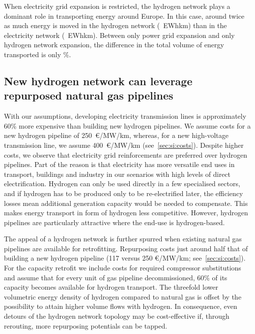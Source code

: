 When electricity grid expansion is restricted, the hydrogen network plays a
dominant role in transporting energy around Europe. In this case, around twice
as much energy is moved in the hydrogen network (\ewhkmhydrogen~EWhkm) than in
the electricity network (\ewhkmelectricity~EWhkm). Between only power grid
expansion and only hydrogen network expansion, the difference in the total
volume of energy transported is only \ewhkmdiff\%.

\subsection*{New hydrogen network can leverage repurposed natural gas pipelines}
\label{sec:repurposed}

With our assumptions, developing electricity transmission lines is approximately
60\% more expensive than building new hydrogen pipelines. We assume costs for a
new hydrogen pipeline of 250~\euro/MW/km, whereas, for a new high-voltage
transmission line, we assume 400~\euro/MW/km (see~\cref{sec:si:costs}). Despite
higher costs, we observe that electricity grid reinforcements are preferred over
hydrogen pipelines. Part of the reason is that electricity has more versatile
end uses in transport, buildings and industry in our scenarios with high levels
of direct electrification. Hydrogen can only be used directly in a few
specialised sectors, and if hydrogen has to be produced only to be
re-electrified later, the efficiency losses mean additional generation capacity
would be needed to compensate. This makes energy transport in form of hydrogen
less competitive. However, hydrogen pipelines are particularly attractive where
the end-use is hydrogen-based.

The appeal of a hydrogen network is further spurred when existing natural gas
pipelines are available for retrofitting. Repurposing costs just around half
that of building a new hydrogen pipeline (117 versus 250 \euro/MW/km;
see~\cref{sec:si:costs}). For the capacity retrofit we include costs for
required compressor substitutions and assume that for every unit of gas pipeline
decommissioned, 60\% of its capacity becomes available for hydrogen transport.
The threefold lower volumetric energy density of hydrogen compared to natural
gas is offset by the possibility to attain higher volume flows with hydrogen. In
consequence, even detours of the hydrogen network topology may be cost-effective
if, through rerouting, more repurposing potentials can be tapped.

